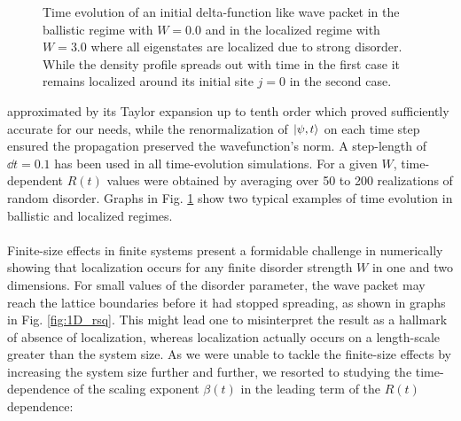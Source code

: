 \documentclass[10pt,a4paper]{article}
\begin{document}
\begin{minipage}[t]{0.72\textwidth}
\begin{figure}[H]
\caption{Time evolution of an initial delta-function like wave packet in the ballistic regime with $W=0.0$ and in the localized regime with $W=3.0$ where all eigenstates are localized due to strong disorder. While the density profile spreads out with time in the first case it remains localized around its initial site $j=0$ in the second case. }
\label{fig:light_cone} 
\end{figure}
\end{minipage}
 approximated by its Taylor expansion up to tenth order which proved sufficiently accurate for our needs, while the renormalization of $\vert\psi,t\rangle$ on each time step ensured the propagation preserved the wavefunction's norm. A step-length of $\dd t=0.1$ has been used in all time-evolution simulations. For a given $W$, time-dependent $R(t)$ values were obtained by averaging over 50 to 200 realizations of random disorder. Graphs in Fig. \ref{fig:light_cone} show two typical examples of time evolution in ballistic and localized regimes. \\\\
Finite-size effects in finite systems present a formidable challenge in numerically showing that localization occurs for any finite disorder strength $W$ in one and two dimensions. For small values of the disorder parameter, the wave packet may reach the lattice boundaries before it had stopped spreading, as shown in graphs in Fig. \ref{fig:1D_rsq}. This might lead one to misinterpret the result as a hallmark of absence of localization, whereas localization actually occurs on a length-scale greater than the system size. As we were unable to tackle the finite-size effects by increasing the system size further and further, we resorted to studying the time-dependence of the scaling exponent $\beta(t)$ in the leading term of the $R(t)$ dependence:
\end{document}
